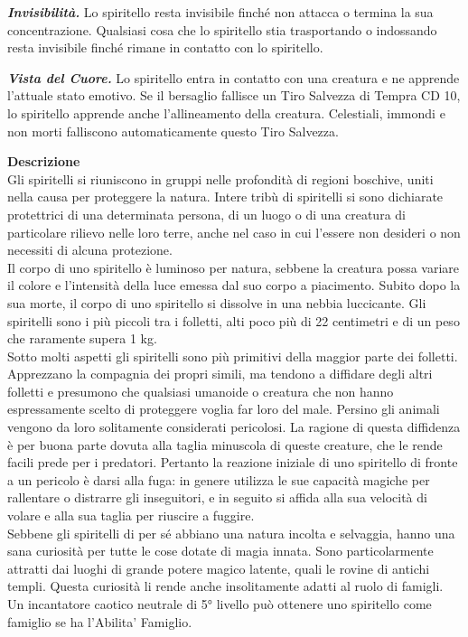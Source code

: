 \begin{multicols}{2}
\emph{\textbf{Invisibilità.}} Lo spiritello resta invisibile finché non attacca o termina la sua concentrazione. Qualsiasi cosa che lo spiritello stia trasportando o indossando resta invisibile finché rimane in contatto con lo spiritello.

\emph{\textbf{Vista del Cuore.}} Lo spiritello entra in contatto con una creatura e ne apprende l'attuale stato emotivo. Se il bersaglio fallisce un Tiro Salvezza di Tempra CD 10, lo spiritello apprende anche l'allineamento della creatura. Celestiali, immondi e non morti falliscono automaticamente questo Tiro Salvezza.

\textbf{Descrizione}\\
Gli spiritelli si riuniscono in gruppi nelle profondità di regioni boschive, uniti nella causa per proteggere la natura. Intere tribù di spiritelli si sono dichiarate protettrici di una determinata persona, di un luogo o di una creatura di particolare rilievo nelle loro terre, anche nel caso in cui l'essere non desideri o non necessiti di alcuna protezione.\\

Il corpo di uno spiritello è luminoso per natura, sebbene la creatura possa variare il colore e l'intensità della luce emessa dal suo corpo a piacimento. Subito dopo la sua morte, il corpo di uno spiritello si dissolve in una nebbia luccicante. Gli spiritelli sono i più piccoli tra i folletti, alti poco più di 22 centimetri e di un peso che raramente supera 1 kg.\\

Sotto molti aspetti gli spiritelli sono più primitivi della maggior parte dei folletti. Apprezzano la compagnia dei propri simili, ma tendono a diffidare degli altri folletti e presumono che qualsiasi umanoide o creatura che non hanno espressamente scelto di proteggere voglia far loro del male. Persino gli animali vengono da loro solitamente considerati pericolosi. La ragione di questa diffidenza è per buona parte dovuta alla taglia minuscola di queste creature, che le rende facili prede per i predatori. Pertanto la reazione iniziale di uno spiritello di fronte a un pericolo è darsi alla fuga: in genere utilizza le sue capacità magiche per rallentare o distrarre gli inseguitori, e in seguito si affida alla sua velocità di volare e alla sua taglia per riuscire a fuggire.\\

Sebbene gli spiritelli di per sé abbiano una natura incolta e selvaggia, hanno una sana curiosità per tutte le cose dotate di magia innata. Sono particolarmente attratti dai luoghi di grande potere magico latente, quali le rovine di antichi templi. Questa curiosità li rende anche insolitamente adatti al ruolo di famigli. Un incantatore caotico neutrale di 5° livello può ottenere uno spiritello come famiglio se ha l'Abilita' Famiglio.\\



\end{multicols}
